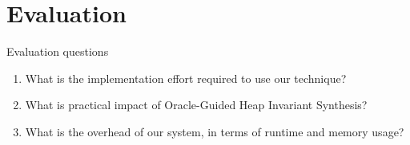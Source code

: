 \section{Evaluation}
\label{sec:eval}

Evaluation questions

\begin{enumerate}
\item What is the implementation effort required to use our technique?
\item What is practical impact of Oracle-Guided Heap Invariant Synthesis?
\item What is the overhead of our system, in terms of runtime and memory usage?
\end{enumerate}

